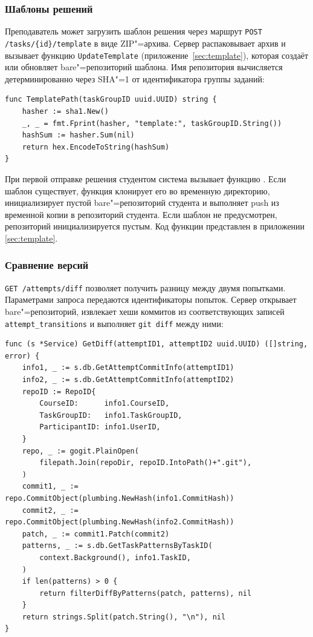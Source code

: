 \documentclass[coursework]{SCWorks}
\begin{document}
\subsubsection{Шаблоны решений}

Преподаватель может загрузить шаблон решения через маршрут \texttt{POST /tasks/\{id\}/template} в виде ZIP"=архива. Сервер распаковывает архив и вызывает функцию \texttt{UpdateTemplate} (приложение~\ref{sec:template}), которая создаёт или обновляет bare"=репозиторий шаблона. Имя репозитория вычисляется детерминированно через SHA"=1 от идентификатора группы заданий:

\begin{verbatim}
func TemplatePath(taskGroupID uuid.UUID) string {
	hasher := sha1.New()
	_, _ = fmt.Fprint(hasher, "template:", taskGroupID.String())
	hashSum := hasher.Sum(nil)
	return hex.EncodeToString(hashSum)
}
\end{verbatim}

При первой отправке решения студентом система вызывает функцию . Если шаблон существует, функция клонирует его во временную директорию, инициализирует пустой bare"=репозиторий студента и выполняет push из временной копии в репозиторий студента. Если шаблон не предусмотрен, репозиторий инициализируется пустым. Код функции  представлен в приложении \ref{sec:template}.

\subsubsection{Сравнение версий}

\texttt{GET /attempts/diff} позволяет получить разницу между двумя попытками. Параметрами запроса передаются идентификаторы попыток. Сервер открывает bare"=репозиторий, извлекает хеши коммитов из соответствующих записей \texttt{attempt\_transitions} и выполняет \texttt{git diff} между ними:

\begin{verbatim}
func (s *Service) GetDiff(attemptID1, attemptID2 uuid.UUID) ([]string, error) {
    info1, _ := s.db.GetAttemptCommitInfo(attemptID1)
    info2, _ := s.db.GetAttemptCommitInfo(attemptID2)
    repoID := RepoID{
        CourseID:      info1.CourseID,
        TaskGroupID:   info1.TaskGroupID,
        ParticipantID: info1.UserID,
    }
    repo, _ := gogit.PlainOpen(
        filepath.Join(repoDir, repoID.IntoPath()+".git"),
    )
    commit1, _ := repo.CommitObject(plumbing.NewHash(info1.CommitHash))
    commit2, _ := repo.CommitObject(plumbing.NewHash(info2.CommitHash))
    patch, _ := commit1.Patch(commit2)
    patterns, _ := s.db.GetTaskPatternsByTaskID(
        context.Background(), info1.TaskID,
    )
    if len(patterns) > 0 {
        return filterDiffByPatterns(patch, patterns), nil
    }
    return strings.Split(patch.String(), "\n"), nil
}
\end{verbatim}
\end{document}
